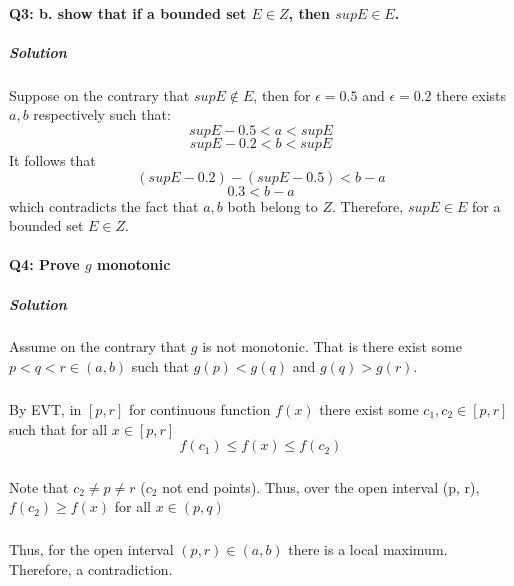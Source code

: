 \documentclass{article}
\begin{document}
\paragraph{Q3: b. show that if a bounded set $E \in Z$, then $supE \in E$.}
\subparagraph{Solution}
Suppose on the contrary that $supE \not\in E$, then for $\epsilon = 0.5$ and $\epsilon = 0.2$ there exists $a, b$ respectively such that:
\begin{equation*}
supE - 0.5 < a < supE
\end{equation*}
\begin{equation*}
supE - 0.2 < b < supE
\end{equation*}
It follows that 
\begin{equation*}
(supE - 0.2) - (supE - 0.5) < b - a
\end{equation*}
\begin{equation*}
0.3 < b - a
\end{equation*}
which contradicts the fact that $a, b$ both belong to $Z$. Therefore, $supE \in E$ for a bounded set $E \in Z$.
\paragraph{Q4: Prove $g$ monotonic}
\subparagraph{Solution} 
Assume on the contrary that $g$ is not monotonic. That is there exist some $p < q < r \in (a, b)$ such that $g(p) < g(q)$ and $g(q) > g(r)$. 
\subparagraph{}
By EVT, in $[p, r]$ for continuous function $f(x)$ there exist some $c_1, c_2 \in [p, r]$ such that for all $x \in [p, r]$
\[f(c_1) \leq f(x) \leq f(c_2) \]
\subparagraph{}
Note that $c_2 \not = p \not = r$ ($c_2$ not end points). Thus, over the open interval (p, r), $f(c_2) \geq f(x)$ for all $x \in (p, q)$
\subparagraph{} 
Thus, for the open interval $(p, r) \in (a, b)$ there is a local maximum. Therefore, a contradiction.
\end{document}
